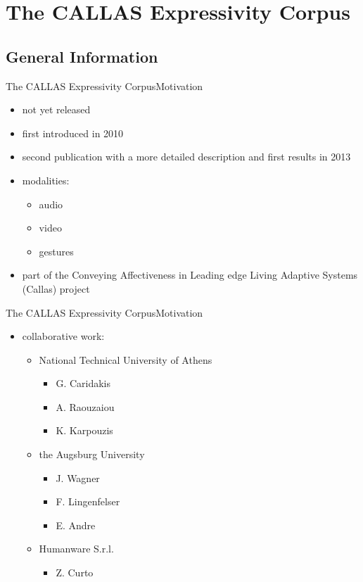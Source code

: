 \documentclass{beamer}
\begin{document}
	\section{The CALLAS Expressivity Corpus}			
		\subsection{General Information}
				\begin{frame}{The CALLAS Expressivity Corpus}{Motivation}			
					\begin{itemize}
						\item not yet released
						\item first introduced in 2010 \cite{2010MultimodalCorpusForGestureExpressivity}
						\item second publication with a more detailed description and first results in 2013 \cite{Caridakis2013}
						\item modalities:
						\begin{itemize}
							\item audio
							\item video
							\item gestures
						\end{itemize}
						\item part of the Conveying Affectiveness in Leading edge Living Adaptive
	Systems (Callas) project
					\end{itemize}											
				\end{frame}		
				\begin{frame}{The CALLAS Expressivity Corpus}{Motivation}			
					\begin{itemize}
						\item collaborative work:
						\begin{itemize}
							\item National Technical University of Athens
								\begin{itemize}
									\item G. Caridakis
									\item A. Raouzaiou
									\item K. Karpouzis
								\end{itemize}
							\item the Augsburg University
								\begin{itemize}
									\item J. Wagner
									\item F. Lingenfelser
									\item E. Andre
								\end{itemize}
							\item Humanware S.r.l.
								\begin{itemize}
									\item Z. Curto
								\end{itemize}
						\end{itemize}
					\end{itemize}											
				\end{frame}		
				
\end{document}
